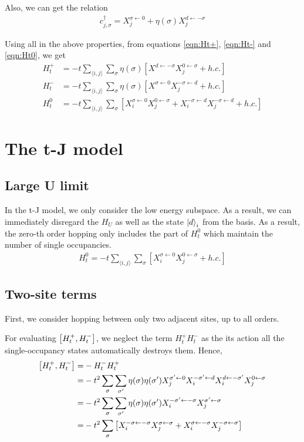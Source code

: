 \documentclass[]{report}
\begin{document}
Also, we can get the relation
\begin{align}
c^{\dagger}_{j, \sigma} = X^{\sigma \leftarrow 0}_j + \eta(\sigma) X^{d \leftarrow -\sigma}_{j}
\end{align}

Using all in the above properties, from equations \eqref{eqn:Ht+}, \eqref{eqn:Ht-} and \eqref{eqn:Ht0}, we get
\begin{align}
\label{eqn:Ht+hubbard}
H^{+}_{t} &= -t \sum_{\langle i, j \rangle} \sum_{\sigma} \eta(\sigma) \left[ X^{d \leftarrow -\sigma} X^{0 \leftarrow \sigma}_j + h.c. \right]\\
\label{eqn:Ht-hubbard}
H^{-}_{t} &= -t \sum_{\langle i, j \rangle} \sum_{\sigma} \eta(\sigma) \left[ X^{\sigma \leftarrow 0} X^{-\sigma \leftarrow d}_j + h.c. \right]\\
H^{0}_{t} &= -t \sum_{\langle i, j \rangle} \sum_{\sigma} \left[ X^{\sigma \leftarrow 0}_{i} X^{0 \leftarrow \sigma}_{j} + X^{-\sigma \leftarrow d}_{i} X^{-\sigma \leftarrow d}_{j} + h.c. \right]
\end{align}

\chapter{The t-J model}
\section{Large U limit}
In the t-J model, we only consider the low energy subspace. As a result, we can immediately disregard the $ H_U $ as well as the state $ \ket{d}_i $ from the basis. As a result, the zero-th order hopping only includes the part of $ H^{0}_{t} $ which maintain the number of single occupancies.
\begin{align}
H^{0}_{t} = -t \sum_{\langle i, j \rangle} \sum_{\sigma} \left[ X^{\sigma \leftarrow 0}_i X^{0 \leftarrow \sigma}_j + h.c. \right]
\end{align}

\section{Two-site terms}
First, we consider hopping between only two adjacent sites, up to all orders.

For evaluating $ \comm{H^{+}_{t}}{H^{-}_{t}} $, we neglect the term $ H^{+}_{t} H^{-}_{t} $ as the its action all the single-occupancy states automatically destroys them. Hence,
\begin{align}
\nonumber
\comm{H^{+}_{t}}{H^{-}_{t}} =&  -H^{-}_{t} H^{+}_{t}\\
\nonumber
=& -t^2 \sum_{\sigma} \sum_{\sigma'} \eta(\sigma) \eta(\sigma') X^{\sigma' \leftarrow 0}_j X^{-\sigma' \leftarrow d}_i X^{d \leftarrow-\sigma'}_i X^{0 \leftarrow \sigma}_j\\
\nonumber
=& -t^2 \sum_{\sigma} \sum_{\sigma'} \eta(\sigma) \eta(\sigma')  X^{-\sigma' \leftarrow -\sigma}_i X^{\sigma' \leftarrow \sigma}_j\\
=& -t^2 \sum_{\sigma}\left[ X^{-\sigma \leftarrow -\sigma}_i  X^{\sigma \leftarrow \sigma}_j + X^{\sigma \leftarrow -\sigma}_i  X^{-\sigma \leftarrow \sigma}_j \right]
\end{align}
\end{document}
